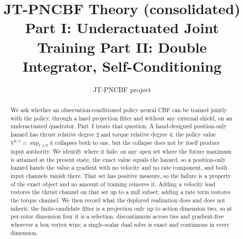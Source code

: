 \documentclass[11pt]{article}
\title{\textbf{JT-PNCBF Theory (consolidated)}\\[2mm]
{\large Part I: Underactuated Joint Training \quad\textbullet\quad Part II: Double Integrator, Self-Conditioning}}
\author{JT-PNCBF project}
\date{}
\theoremstyle{plain}
\theoremstyle{definition}
\theoremstyle{remark}
\newcommand{\Vhp}[1]{V^{h,#1}}
\newcommand{\Vhpi}{\Vhp{\pi}}
\begin{document}
\maketitle

\begin{abstract}
We ask whether an observation-conditioned policy neural CBF can be trained jointly with the
policy, through a hard projection filter and without any external shield, on an underactuated
quadrotor. Part~I treats that question. A hand-designed position-only hazard has thrust
relative degree $2$ and torque relative degree $4$; the policy value $\Vhpi=\sup_{t\ge0}h$
collapses both to one, but the collapse does not by itself produce input authority. We identify
where it fails: on any open set where the future maximum is attained at the present state, the
exact value equals the hazard, so a position-only hazard hands the value a gradient with no
velocity and no rate component, and both input channels vanish there. That set has positive
measure, so the failure is a property of the exact object and no amount of training removes it.
Adding a velocity lead restores the thrust channel on that set up to a null subset; adding a
rate term restores the torque channel. We then record what the deployed realization does and
does not inherit: the finite-candidate filter is a projection only up to action dimension two,
so at per-rotor dimension four it is a selection, discontinuous across ties and gradient-free
wherever a box vertex wins; a single-scalar dual solve is exact and continuous in every
dimension.


\end{abstract}
\end{document}
